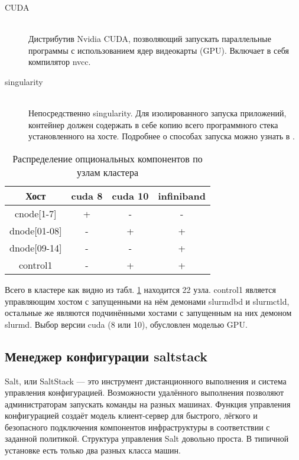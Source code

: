 \documentclass[a4paper]{extarticle}
\begin{document}
\begin{description}
  \item[CUDA] \hfill \\ Дистрибутив Nvidia CUDA, позволяющий запускать параллельные программы с использованием ядер видеокарты (GPU). Включает в себя компилятор nvcc.

  \item[singularity] \hfill \\ Непосредственно singularity. Для изолированного запуска приложений, контейнер должен содержать в себе копию всего программного стека установленного на хосте. Подробнее о способах запуска можно узнать в \cite{mpisingularity}.
\end{description}

\begin{table}[h!]
\centering
\captionsetup[table]{position=below,justification=raggedright}
\caption{Распределение опциональных компонентов по узлам кластера}
\begin{tabular}{|c|ccc|}
\hline
Хост & cuda 8 & cuda 10 & infiniband \\
\hline
cnode[1-7]      &  +          & -             & - \\
dnode[01-08]  &  -           &  +           & + \\
dnode[09-14]  &  -           & -             & + \\ 
control1          & -            & +            & + \\ 
\hline
\end{tabular}
\label{tab:clus}
\end{table}

Всего в кластере как видно из табл. \ref{tab:clus} находится 22 узла. control1 является управляющим хостом с запущенными на нём демонами slurmdbd и slurmctld, остальные же являются подчинёнными хостами с запущенным на них демоном slurmd. Выбор версии cuda (8 или 10), обусловлен моделью GPU.

\subsection{Менеджер конфигурации saltstack}

Salt, или SaltStack --- это инструмент дистанционного выполнения и система управления конфигурацией. Возможности удалённого выполнения позволяют администраторам запускать команды на разных машинах. Функция управления конфигурацией создаёт модель клиент-сервер для быстрого, лёгкого и безопасного подключения компонентов инфраструктуры в соответствии с заданной политикой. Структура управления Salt довольно проста. В типичной установке есть только два разных класса машин.
\end{document}

